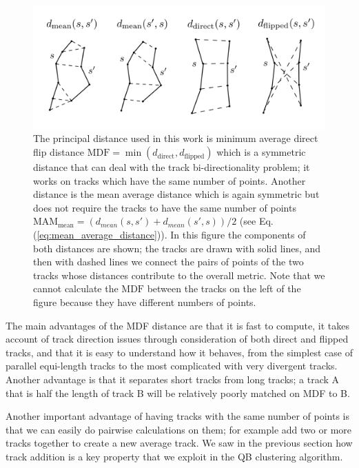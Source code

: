 \documentclass[journal]{IEEEtran}
\begin{document}
\begin{figure}
\includegraphics[scale=0.35]{Fig_2_distances2}
\centering{}
\caption{The principal distance used in this work is minimum average direct flip
distance $\textrm{MDF}=\min(d_{\textrm{direct}},d_{\textrm{flipped}})$ which is
a symmetric distance that can deal with the track bi-directionality problem; it
works on tracks which have the same number of points.  Another distance is the
mean average distance which is again symmetric but does not require the tracks
to have the same number of points
$\textrm{MAM}_{\textrm{mean}}=(d_{mean}(s,s')+d_{mean}(s',s))/2$ (see Eq.
(\ref{eq:mean_average_distance})).  In this figure the components of both
distances are shown; the tracks are drawn with solid lines, and then with dashed
lines we connect the pairs of points of the two tracks whose distances
contribute to the overall metric. Note that we cannot calculate the
$\textrm{MDF}$ between the tracks on the left of the figure because they have
different numbers of points.
\label{Flo:Distances_used}}
\end{figure}

The main advantages of the MDF distance are that it is fast to compute,
it takes account of track direction issues through consideration of both
direct and flipped tracks, and that it is easy to understand how it
behaves, from the simplest case of parallel equi-length tracks to the
most complicated with very divergent tracks. Another advantage is that
it separates short tracks from long tracks; a track A that is half the length of
track B will be relatively poorly matched on MDF to B.  

Another important advantage of having tracks with the same number of points is
that we can easily do pairwise calculations on them; for example add two or more
tracks together to create a new average track. We saw in the previous section
how track addition is a key property that we exploit in the QB clustering
algorithm.
\end{document}
